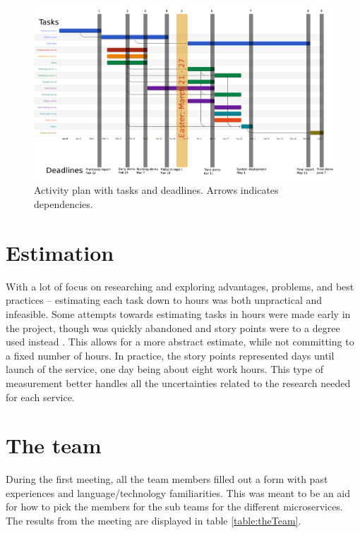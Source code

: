 \begin{figure}[H]
    \includegraphics[width=\textwidth]{fig/plan}
    \caption{Activity plan with tasks and deadlines. Arrows indicates dependencies.}
    \label{fig:deadlines}
\end{figure}

\section{Estimation}

With a lot of focus on researching and exploring advantages, problems, and best practices -- estimating each task down to hours was both unpractical and infeasible. Some attempts towards estimating tasks in hours were made early in the project, though was quickly abandoned and story points were to a degree used instead \citep{storyPoints}. This allows for a more abstract estimate, while not committing to a fixed number of hours. In practice, the story points represented days until launch of the service, one day being about eight work hours. This type of measurement better handles all the uncertainties related to the research needed for each service. 

\section{The team}
During the first meeting, all the team members filled out a form with past experiences and language/technology familiarities. This was meant to be an aid for how to pick the members for the sub teams for the different microservices. The results from the meeting are displayed in table \ref{table:theTeam}. 

